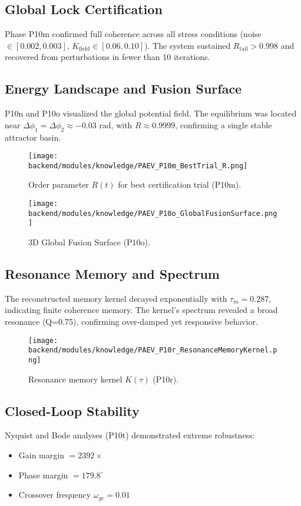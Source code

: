 \documentclass[conference]{IEEEtran}
\begin{document}
\subsection{Global Lock Certification}
Phase P10m confirmed full coherence across all stress conditions (noise $\in [0.002,0.003]$, $K_{\text{field}}\in[0.06,0.10]$). The system sustained $R_{\text{tail}}>0.998$ and recovered from perturbations in fewer than 10 iterations.

\subsection{Energy Landscape and Fusion Surface}
P10n and P10o visualized the global potential field. The equilibrium was located near $\Delta\phi_1=\Delta\phi_2\approx-0.03$ rad, with $R\approx0.9999$, confirming a single stable attractor basin.

\begin{figure}[h]
\centering
\texttt{[image: backend/modules/knowledge/PAEV\_P10m\_BestTrial\_R.png]}
\caption{Order parameter $R(t)$ for best certification trial (P10m).}
\end{figure}

\begin{figure}[h]
\centering
\texttt{[image: backend/modules/knowledge/PAEV\_P10o\_GlobalFusionSurface.png]}
\caption{3D Global Fusion Surface (P10o).}
\end{figure}

\subsection{Resonance Memory and Spectrum}
The reconstructed memory kernel decayed exponentially with $\tau_m=0.287$, indicating finite coherence memory. The kernel’s spectrum revealed a broad resonance (Q=0.75), confirming over-damped yet responsive behavior.

\begin{figure}[h]
\centering
\texttt{[image: backend/modules/knowledge/PAEV\_P10r\_ResonanceMemoryKernel.png]}
\caption{Resonance memory kernel $K(\tau)$ (P10r).}
\end{figure}

\subsection{Closed-Loop Stability}
Nyquist and Bode analyses (P10t) demonstrated extreme robustness:
\begin{itemize}
    \item Gain margin $=2392\times$
    \item Phase margin $=179.8^\circ$
    \item Crossover frequency $\omega_{gc}=0.01$
\end{itemize}
\end{document}
